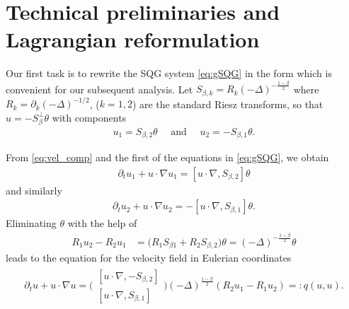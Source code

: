\documentclass[11pt]{amsart}
\numberwithin{equation}{section}
\begin{document}
\section{Technical preliminaries and Lagrangian reformulation}	\label{geometricappro}

Our first task is to rewrite the SQG system \eqref{eq:gSQG} in the form which is convenient for our subsequent analysis. Let $S_{\beta,k}=R_k(-\Delta)^{-\frac{1-\beta}{2}}$ where $R_k=\partial_k(-\Delta)^{-1/2}$, ($k=1,2$) are the standard Riesz transforms, so that 
$u = - S_\beta^\perp\theta$ 
with components 
% 
\begin{align}\label{eq:vel_comp}
u_1=S_{\beta,2} \theta \quad \text{ and }\quad u_2 
= 
-S_{\beta,1} \theta. 
\end{align} 


% 
From \eqref{eq:vel_comp} and the first of the equations in \eqref{eq:gSQG}, we obtain
	\begin{align}\label{gSQG1coor}
		\partial_t u_1 +u\cdot \nabla u_1
		=[ u\cdot \nabla,S_{\beta,2}]\theta
	\end{align}
and similarly 
%
	\begin{align}\label{gSQG2coor}
		\partial_t u_2 +u\cdot \nabla u_2
		=-[ u\cdot \nabla,S_{\beta,1}]\theta.
	\end{align}
%
Eliminating $\theta$ with the help of
	\begin{align}\label{eq:theta-u}
	R_1u_2-R_2u_1&=\big(R_1S_{\beta1}+R_2S_{\beta,2}\big)\theta=(-\Delta)^{-\frac{1-\beta}{2}}\theta
	\end{align} 
leads to the equation for the velocity field in Eulerian coordinates
	\begin{align}\label{rewriteeqn}
		\partial_t u +u\cdot \nabla u=\Bigg(
		\begin{matrix}
			[ u\cdot \nabla,-S_{\beta,2}]\\
			[ u\cdot \nabla,S_{\beta,1}]
		\end{matrix}\Bigg)(-\Delta)^{\frac{1-\beta}{2}}(R_2u_1-R_1u_2)=:q(u,u).
	\end{align}
%
\end{document}
